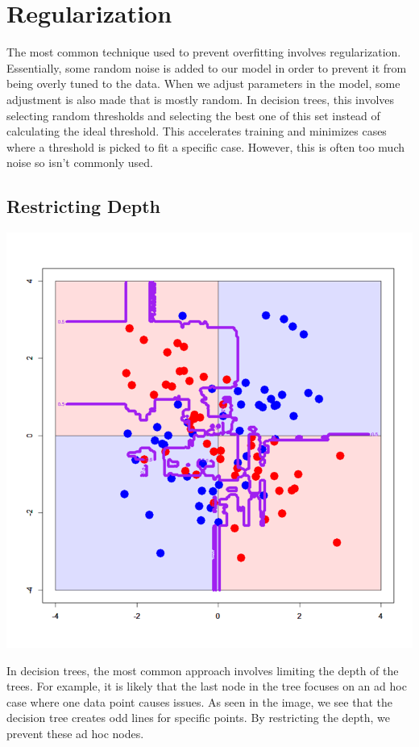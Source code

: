 \documentclass{article}
\begin{document}
\section{Regularization}
The most common technique used to prevent overfitting involves regularization. Essentially, some random noise is added to our model in order to prevent it from being overly tuned to the data. When we adjust parameters in the model, some adjustment is also made that is mostly random. In decision trees, this involves selecting random thresholds and selecting the best one of this set instead of calculating the ideal threshold. This accelerates training and minimizes cases where a threshold is picked to fit a specific case. However, this is often too much noise so isn't commonly used.

\subsection{Restricting Depth}
\begin{center}
    \includegraphics[scale=0.3]{decisiontreeoverfit.png}
\end{center}
In decision trees, the most common approach involves limiting the depth of the trees. For example, it is likely that the last node in the tree focuses on an ad hoc case where one data point causes issues. As seen in the image, we see that the decision tree creates odd lines for specific points. By restricting the depth, we prevent these ad hoc nodes.
\end{document}
